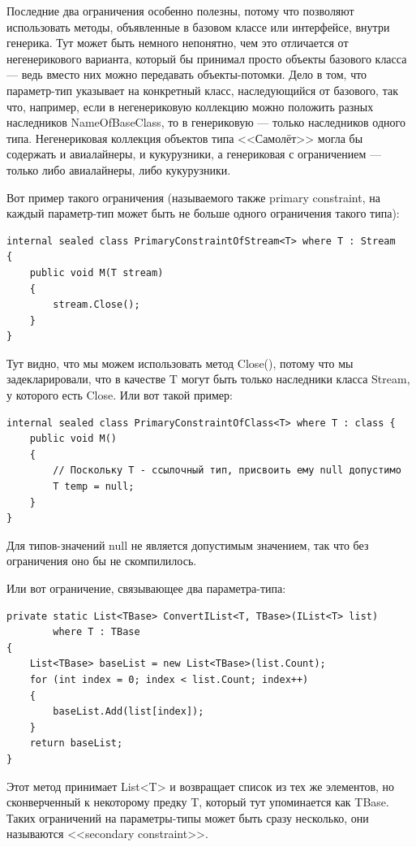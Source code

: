 \documentclass[a5paper]{article}
\begin{document}
Последние два ограничения особенно полезны, потому что позволяют использовать методы, объявленные в базовом классе или интерфейсе, внутри генерика. Тут может быть немного непонятно, чем это отличается от негенерикового варианта, который бы принимал просто объекты базового класса --- ведь вместо них можно передавать объекты-потомки. Дело в том, что параметр-тип указывает на конкретный класс, наследующийся от базового, так что, например, если в негенериковую коллекцию можно положить разных наследников NameOfBaseClass, то в генериковую --- только наследников одного типа. Негенериковая коллекция объектов типа <<Самолёт>> могла бы содержать и авиалайнеры, и кукурузники, а генериковая с ограничением --- только либо авиалайнеры, либо кукурузники.

Вот пример такого ограничения (называемого также primary constraint, на каждый параметр-тип может быть не больше одного ограничения такого типа):

\begin{verbatim}
internal sealed class PrimaryConstraintOfStream<T> where T : Stream 
{
    public void M(T stream) 
    {
        stream.Close();
    }
}
\end{verbatim}

Тут видно, что мы можем использовать метод Close(), потому что мы задекларировали, что в качестве T могут быть только наследники класса Stream, у которого есть Close. Или вот такой пример:

\begin{verbatim}
internal sealed class PrimaryConstraintOfClass<T> where T : class {
    public void M() 
    {
        // Поскольку T - ссылочный тип, присвоить ему null допустимо
        T temp = null;
    }
}
\end{verbatim}

Для типов-значений null не является допустимым значением, так что без ограничения оно бы не скомпилилось.

Или вот ограничение, связывающее два параметра-типа:

\begin{verbatim}
private static List<TBase> ConvertIList<T, TBase>(IList<T> list)
        where T : TBase 
{
    List<TBase> baseList = new List<TBase>(list.Count);
    for (int index = 0; index < list.Count; index++) 
    {
        baseList.Add(list[index]);
    }
    return baseList;
}
\end{verbatim}

Этот метод принимает List<T> и возвращает список из тех же элементов, но сконверченный к некоторому предку T, который тут упоминается как TBase. Таких ограничений на параметры-типы может быть сразу несколько, они называются <<secondary constraint>>.
\end{document}

